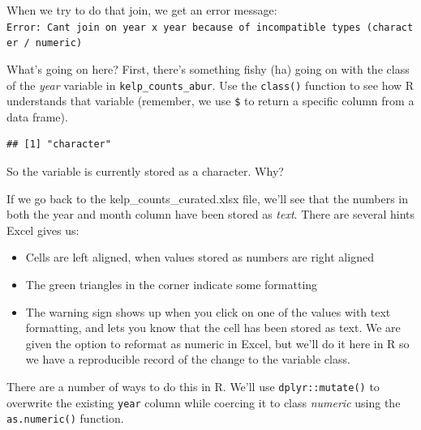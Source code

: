 \documentclass[]{book}
\newenvironment{Shaded}{\begin{snugshade}}{\end{snugshade}}
\newcommand{\CommentTok}[1]{\textcolor[rgb]{0.56,0.35,0.01}{\textit{#1}}}
\newcommand{\DataTypeTok}[1]{\textcolor[rgb]{0.13,0.29,0.53}{#1}}
\newcommand{\KeywordTok}[1]{\textcolor[rgb]{0.13,0.29,0.53}{\textbf{#1}}}
\newcommand{\NormalTok}[1]{#1}
\newcommand{\OperatorTok}[1]{\textcolor[rgb]{0.81,0.36,0.00}{\textbf{#1}}}
\newcommand{\StringTok}[1]{\textcolor[rgb]{0.31,0.60,0.02}{#1}}
\providecommand{\tightlist}{%
  \setlength{\itemsep}{0pt}\setlength{\parskip}{0pt}}
\begin{document}
When we try to do that join, we get an error message:
\texttt{Error:\ Can\textquotesingle{}t\ join\ on\ \textquotesingle{}year\textquotesingle{}\ x\ \textquotesingle{}year\textquotesingle{}\ because\ of\ incompatible\ types\ (character\ /\ numeric)}

What's going on here? First, there's something fishy (ha) going on with the class of the \emph{year} variable in \texttt{kelp\_counts\_abur}. Use the \texttt{class()} function to see how R understands that variable (remember, we use \texttt{\$} to return a specific column from a data frame).

\begin{Shaded}
\end{Shaded}

\begin{verbatim}
## [1] "character"
\end{verbatim}

So the variable is currently stored as a character. Why?

If we go back to the kelp\_counts\_curated.xlsx file, we'll see that the numbers in both the year and month column have been stored as \emph{text}. There are several hints Excel gives us:

\begin{itemize}
\tightlist
\item
  Cells are left aligned, when values stored as numbers are right aligned
\item
  The green triangles in the corner indicate some formatting
\item
  The warning sign shows up when you click on one of the values with text formatting, and lets you know that the cell has been stored as text. We are given the option to reformat as numeric in Excel, but we'll do it here in R so we have a reproducible record of the change to the variable class.
\end{itemize}

There are a number of ways to do this in R. We'll use \texttt{dplyr::mutate()} to overwrite the existing \texttt{year} column while coercing it to class \emph{numeric} using the \texttt{as.numeric()} function.

\begin{Shaded}
\end{Shaded}
\end{document}
